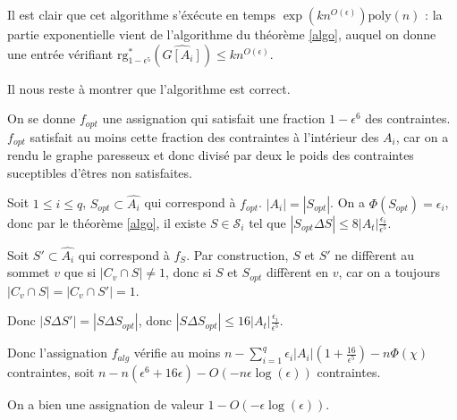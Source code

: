 \documentclass[a4paper,10pt]{article}
\theoremstyle{plain}
\theoremstyle{Definition}
\theoremstyle{remark}
\newcommand{\rg}{\mathrm{rg}}
\newcommand{\poly}{\mathrm{poly}}
\begin{document}
\vspace{1cm}

Il est clair que cet algorithme s'éxécute en temps
$\exp(kn^{O(\epsilon)})\poly(n)$ : la partie exponentielle vient de
l'algorithme du théorème \ref{algo}, auquel on donne une entrée vérifiant
$\rg^*_{1-\epsilon^5}(\hat{G[A_i]}) \leq kn^{O(\epsilon)}$.

Il nous reste à montrer que l'algorithme est correct.

\vspace{0.5cm}

On se donne $f_{opt}$ une assignation qui satisfait une fraction $1 -
\epsilon^6$ des contraintes. $f_{opt}$ satisfait au moins cette fraction
des contraintes à l'intérieur des $A_i$, car on a rendu le graphe paresseux
et donc divisé par deux le poids des contraintes suceptibles d'êtres non
satisfaites.

\vspace{0.5cm}

Soit $1\leq i \leq q$, $S_{opt} \subset \hat{A_i}$ qui correspond à
$f_{opt}$. $|A_i| = |S_{opt}|$. On a $\Phi(S_{opt})=\epsilon_i$, donc par
le théorème \ref{algo}, il existe $S \in {\mathcal S}_i$ tel que $|S_{opt}
\Delta S| \leq 8|A_t|\frac{\epsilon_i}{\epsilon^5}$.

\vspace{0.5cm}

Soit $S' \subset \hat{A_i}$ qui correspond à $f_S$. Par construction, $S$
et $S'$ ne diffèrent au sommet $v$ que si $|C_v \cap S| \not = 1$, donc si
$S$ et $S_{opt}$ diffèrent en $v$, car on a toujours $|C_v \cap S| = |C_v
\cap S'| = 1$. 

Donc $|S \Delta S'| = |S \Delta S_{opt}|$, donc $|S \Delta S_{opt}| \leq
16|A_t|\frac{\epsilon_i}{\epsilon^5}$.

\vspace{0.5cm}

Donc l'assignation $f_{alg}$ vérifie au moins $n - \sum_{i=1}^q
\epsilon_i|A_i| (1 + \frac{16}{\epsilon^5}) - n\Phi(\chi)$ contraintes, soit
$n - n(\epsilon^6 + 16\epsilon) - O(-n \epsilon \log(\epsilon))$
contraintes.

On a bien une assignation de valeur $1 - O(-\epsilon \log(\epsilon))$.




\end{document}

